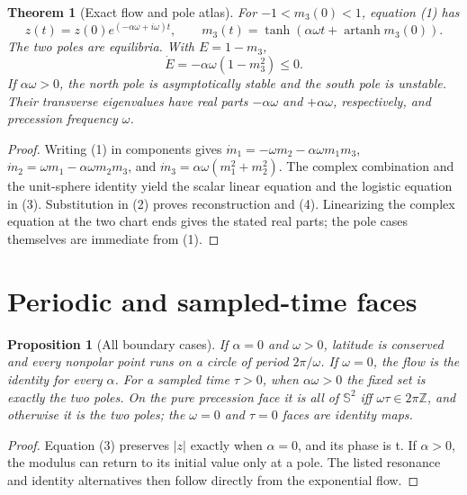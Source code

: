 \documentclass[10pt]{article}
\newtheorem{theorem}{Theorem}
\newtheorem{proposition}{Proposition}
\newcommand{\Sph}{\mathbb S^2}
\begin{document}
\begin{theorem}[Exact flow and pole atlas]\label{thm:flow}
For \(-1<m_3(0)<1\), equation (1) has
\begin{equation}
 z(t)=z(0)e^{(-\alpha\omega+i\omega)t},\qquad
 m_3(t)=\tanh\!\left(\alpha\omega t+\operatorname{artanh}m_3(0)\right).
 \tag{3}
\end{equation}
The two poles are equilibria.  With \(E=1-m_3\),
\begin{equation}
 \dot E=-\alpha\omega(1-m_3^2)\leq0. \tag{4}
\end{equation}
If \(\alpha\omega>0\), the north pole is asymptotically stable and the south
pole is unstable.  Their transverse eigenvalues have real parts
\(-\alpha\omega\) and \(+\alpha\omega\), respectively, and precession
frequency \(\omega\).
\end{theorem}
\begin{proof}
Writing (1) in components gives
\(\dot m_1=-\omega m_2-\alpha\omega m_1m_3\),
\(\dot m_2=\omega m_1-\alpha\omega m_2m_3\), and
\(\dot m_3=\alpha\omega(m_1^2+m_2^2)\).  The complex combination and the
unit-sphere identity yield the scalar linear equation and the logistic
equation in (3).  Substitution in (2) proves reconstruction and (4).
Linearizing the complex equation at the two chart ends gives the stated
real parts; the pole cases themselves are immediate from (1).
\end{proof}

\section{Periodic and sampled-time faces}
\begin{proposition}[All boundary cases]\label{prop:faces}
If \(\alpha=0\) and \(\omega>0\), latitude is conserved and every nonpolar
point runs on a circle of period \(2\pi/\omega\).  If \(\omega=0\), the flow
is the identity for every \(\alpha\).  For a sampled time \(\tau>0\), when
\(\alpha\omega>0\) the fixed set is exactly the two poles.  On the pure
precession face it is all of \(\Sph\) iff \(\omega\tau\in2\pi\mathbb Z\),
and otherwise it is the two poles; the \(\omega=0\) and \(\tau=0\) faces are
identity maps.
\end{proposition}
\begin{proof}
Equation (3) preserves \(|z|\) exactly when \(\alpha=0\), and its phase is
\omega t.  If \(\alpha>0\), the modulus can return to its initial value only
at a pole.  The listed resonance and identity alternatives then follow
directly from the exponential flow.
\end{proof}
\end{document}
